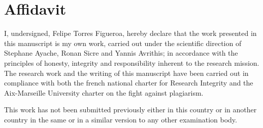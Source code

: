 \newpage
\chapter*{Affidavit}					
\thispagestyle{empty}

\iftrue %
    I, undersigned, Felipe Torres Figueroa, %
    hereby declare that the work presented in this manuscript is my own work, carried out under the scientific direction
    of Stephane Ayache, Ronan Sicre and Yannis Avrithis; %
    in accordance with the principles of honesty, integrity and responsibility inherent to the research mission. The research work and the writing of this manuscript have been carried out in compliance with both the french national charter for Research Integrity and the Aix-Marseille University charter on the fight against plagiarism.
    
    This work has not been submitted previously either in this country or in another country in the same or in a similar version to any other examination body.\\
    
